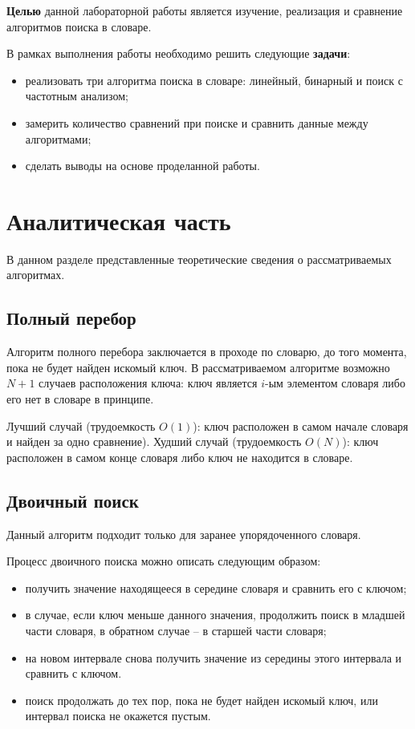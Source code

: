 \documentclass[12pt]{report}
\begin{document}
\textbf{Целью} данной лабораторной работы является изучение, реализация и сравнение алгоритмов поиска в словаре.

В рамках выполнения работы необходимо решить следующие \textbf{задачи}:

\begin{itemize}
	\item реализовать три алгоритма поиска в словаре: линейный, бинарный и поиск с частотным анализом;
	\item замерить количество сравнений при поиске и сравнить данные между алгоритмами;
	\item сделать выводы на основе проделанной работы.
\end{itemize}

\chapter{Аналитическая часть}

В данном разделе представленные теоретические сведения о рассматриваемых алгоритмах.

\section{Полный перебор}

Алгоритм полного перебора заключается в проходе по словарю, до того момента, пока не будет найден искомый ключ. В рассматриваемом алгоритме возможно $N + 1$ случаев расположения ключа: ключ является $i$-ым элементом словаря либо его нет в словаре в принципе. 

Лучший случай (трудоемкость $O(1)$): ключ расположен в самом начале словаря и найден за одно сравнение). Худший случай (трудоемкость $O(N)$): ключ расположен в самом конце словаря либо ключ не находится в словаре.

\section{Двоичный поиск}

Данный алгоритм подходит только для заранее упорядоченного словаря.

Процесс двоичного поиска можно описать следующим образом: 

\begin{itemize}
	\item получить значение находящееся в середине словаря и сравнить его с ключом;
	\item в случае, если ключ меньше данного значения, продолжить поиск в младшей части словаря, в обратном случае -- в старшей части словаря;
	\item на новом интервале снова получить значение из середины этого интервала и сравнить с ключом.
	\item поиск продолжать до тех пор, пока не будет найден искомый ключ, или интервал поиска не окажется пустым.
\end{itemize}
\end{document}
